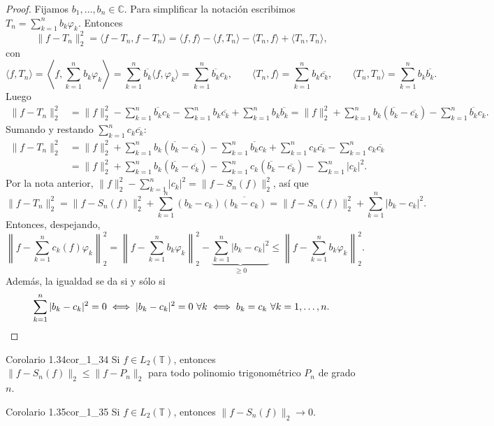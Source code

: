 \begin{proof}
Fijamos $b_1, \dots, b_n \in \mathbb{C}$. Para simplificar la notación escribimos $T_n = \sum_{k=1}^n b_k\varphi_k$. Entonces
\[
\|f - T_n\|_2^2 = \langle f - T_n, f - T_n\rangle = \langle f, f\rangle - \langle f, T_n\rangle - \langle T_n, f\rangle + \langle T_n, T_n\rangle,
\]
con
\[
\langle f, T_n\rangle = \left\langle f, \sum_{k=1}^n b_k\varphi_k\right\rangle = \sum_{k=1}^n \overline{b_k}\langle f, \varphi_k\rangle = \sum_{k=1}^n \overline{b_k}c_k, \qquad \langle T_n, f\rangle = \sum_{k=1}^n b_k\overline{c_k}, \qquad \langle T_n, T_n\rangle = \sum_{k=1}^n b_k\overline{b_k}.
\]
Luego
\begin{align*}
\|f - T_n\|_2^2 &= \|f\|_2^2 - \sum_{k=1}^n \overline{b_k}c_k - \sum_{k=1}^n b_k\overline{c_k} + \sum_{k=1}^n b_k\overline{b_k} = \|f\|_2^2 + \sum_{k=1}^n b_k(\overline{b_k} - \overline{c_k}) - \sum_{k=1}^n \overline{b_k}c_k.
\end{align*}
Sumando y restando $\sum_{k=1}^n c_k\overline{c_k}$:
\begin{align*}
\|f - T_n\|_2^2 &= \|f\|_2^2 + \sum_{k=1}^n b_k(\overline{b_k} - \overline{c_k}) - \sum_{k=1}^n \overline{b_k}c_k + \sum_{k=1}^n c_k\overline{c_k} - \sum_{k=1}^n c_k\overline{c_k} \\
&= \|f\|_2^2 + \sum_{k=1}^n b_k(\overline{b_k} - \overline{c_k}) - \sum_{k=1}^n c_k(\overline{b_k} - \overline{c_k}) - \sum_{k=1}^n |c_k|^2.
\end{align*}
Por la nota anterior, $\|f\|_2^2 - \sum_{k=1}^n |c_k|^2 = \|f - S_n(f)\|_2^2$, así que
\[
\|f - T_n\|_2^2 = \|f - S_n(f)\|_2^2 + \sum_{k=1}^n (b_k - c_k)\overline{(b_k - c_k)} = \|f - S_n(f)\|_2^2 + \sum_{k=1}^n |b_k - c_k|^2.
\]
Entonces, despejando,
\[
\left\| f - \sum_{k=1}^n c_k(f)\varphi_k \right\|_2^2 = \left\| f - \sum_{k=1}^n b_k\varphi_k \right\|_2^2 - \underbrace{\sum_{k=1}^n |b_k - c_k|^2}_{\ge 0} \le \left\| f - \sum_{k=1}^n b_k\varphi_k \right\|_2^2.
\]
Además, la igualdad se da si y sólo si
\[
\sum_{k=1}^n |b_k - c_k|^2 = 0 \iff |b_k - c_k|^2 = 0 \ \forall k \iff b_k = c_k \ \forall k = 1, \dots, n. \qedhere
\]
\end{proof}

\begin{proposicion}{Corolario 1.34}{cor_1_34}
Si $f \in L_2(\mathbb{T})$, entonces $\|f - S_n(f)\|_2 \le \|f - P_n\|_2$ para todo polinomio trigonométrico $P_n$ de grado $n$.
\end{proposicion}

\begin{proposicion}{Corolario 1.35}{cor_1_35}
Si $f \in L_2(\mathbb{T})$, entonces $\|f - S_n(f)\|_2 \to 0$.
\end{proposicion}

